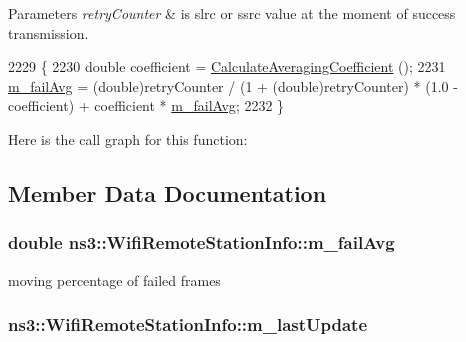 \begin{DoxyParams}{Parameters}
{\em retry\+Counter} & is slrc or ssrc value at the moment of success transmission. \\
\hline
\end{DoxyParams}

\begin{DoxyCode}
2229 \{
2230   \textcolor{keywordtype}{double} coefficient = \hyperlink{classns3_1_1WifiRemoteStationInfo_a7a01e2ac68e10d19c323b875b8155c48}{CalculateAveragingCoefficient} ();
2231   \hyperlink{classns3_1_1WifiRemoteStationInfo_a1ed967fa20b4f80862eaf116787ace41}{m\_failAvg} = (double)retryCounter / (1 + (\textcolor{keywordtype}{double})retryCounter) * (1.0 - coefficient) + 
      coefficient * \hyperlink{classns3_1_1WifiRemoteStationInfo_a1ed967fa20b4f80862eaf116787ace41}{m\_failAvg};
2232 \}
\end{DoxyCode}


Here is the call graph for this function\+:




\subsection{Member Data Documentation}
\subsubsection[{\texorpdfstring{m\+\_\+fail\+Avg}{m_failAvg}}]{\setlength{\rightskip}{0pt plus 5cm}double ns3\+::\+Wifi\+Remote\+Station\+Info\+::m\+\_\+fail\+Avg\hspace{0.3cm}{\ttfamily [private]}}\hypertarget{classns3_1_1WifiRemoteStationInfo_a1ed967fa20b4f80862eaf116787ace41}{}\label{classns3_1_1WifiRemoteStationInfo_a1ed967fa20b4f80862eaf116787ace41}


moving percentage of failed frames 

\subsubsection[{\texorpdfstring{m\+\_\+last\+Update}{m_lastUpdate}}]{ ns3\+::\+Wifi\+Remote\+Station\+Info\+::m\+\_\+last\+Update\hspace{0.3cm}{\ttfamily [private]}}\hypertarget{classns3_1_1WifiRemoteStationInfo_a221d55968aac57a0e727704dcdc066ea}{}\label{classns3_1_1WifiRemoteStationInfo_a221d55968aac57a0e727704dcdc066ea}


